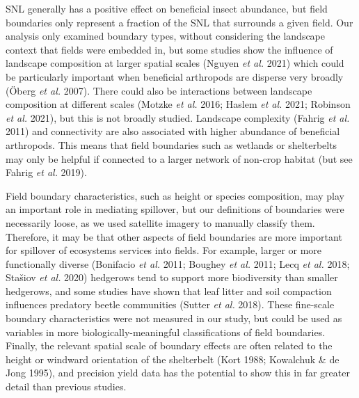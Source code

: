 \documentclass[]{elsarticle} %
\begin{document}
SNL generally has a positive effect on beneficial insect abundance, but field boundaries only represent a fraction of the SNL that surrounds a given field.
Our analysis only examined boundary types, without considering the landscape context that fields were embedded in, but some studies show the influence of landscape composition at larger spatial scales (Nguyen \emph{et al.} 2021) which could be particularly important when beneficial arthropods are disperse very broadly (Öberg \emph{et al.} 2007).
There could also be interactions between landscape composition at different scales (Motzke \emph{et al.} 2016; Haslem \emph{et al.} 2021; Robinson \emph{et al.} 2021), but this is not broadly studied.
Landscape complexity (Fahrig \emph{et al.} 2011) and connectivity are also associated with higher abundance of beneficial arthropods.
This means that field boundaries such as wetlands or shelterbelts may only be helpful if connected to a larger network of non-crop habitat (but see Fahrig \emph{et al.} 2019).

Field boundary characteristics, such as height or species composition, may play an important role in mediating spillover, but our definitions of boundaries were necessarily loose, as we used satellite imagery to manually classify them.
Therefore, it may be that other aspects of field boundaries are more important for spillover of ecosystems services into fields.
For example, larger or more functionally diverse (Bonifacio \emph{et al.} 2011; Boughey \emph{et al.} 2011; Lecq \emph{et al.} 2018; Stašiov \emph{et al.} 2020) hedgerows tend to support more biodiversity than smaller hedgerows, and some studies have shown that leaf litter and soil compaction influences predatory beetle communities (Sutter \emph{et al.} 2018).
These fine-scale boundary characteristics were not measured in our study, but could be used as variables in more biologically-meaningful classifications of field boundaries.
Finally, the relevant spatial scale of boundary effects are often related to the height or windward orientation of the shelterbelt (Kort 1988; Kowalchuk \& de Jong 1995), and precision yield data has the potential to show this in far greater detail than previous studies.
\end{document}
